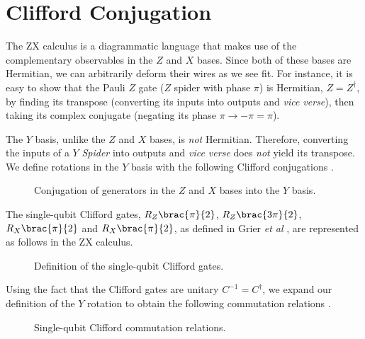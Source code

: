 \section{Clifford Conjugation}%
\label{clifford-conjugation}

The ZX calculus is a diagrammatic language that makes use of the complementary observables in the $Z$ and $X$ bases. Since both of these bases are Hermitian, we can arbitrarily deform their wires as we see fit. For instance, it is easy to show that the Pauli $Z$ gate ($Z$ spider with phase $\pi$) is Hermitian, $Z = Z^\dagger$, by finding its transpose (converting its inputs into outputs and \textit{vice verse}), then taking its complex conjugate (negating its phase $\pi \rightarrow -\pi = \pi$).


The $Y$ basis, unlike the $Z$ and $X$ bases, is \textit{not} Hermitian. Therefore, converting the inputs of a $Y$ \textit{Spider} into outputs and \textit{vice verse} does \textit{not} yield its transpose. We define rotations in the $Y$ basis with the following Clifford conjugations \cite{Yeung2020}.

\begin{figure}[H]
    \centering
    \caption{Conjugation of generators in the $Z$ and $X$ bases into the $Y$ basis.}
    \label{pauli-Y}
\end{figure}

The single-qubit Clifford gates, $R_Z \brac{\pi}{2}$, $R_Z \brac{3\pi}{2}$, $R_X \brac{\pi}{2}$ and $R_X \brac{\pi}{2}$, as defined in Grier \textit{et al} \cite{Grier2016}, are represented as follows in the ZX calculus.

\begin{figure}[H]
    \centering
    \caption{Definition of the single-qubit Clifford gates.}
    \label{clifford-definitions}
\end{figure}


Using the fact that the Clifford gates are unitary $C^{-1} = C^\dagger$, we expand our definition of the $Y$ rotation to obtain the following commutation relations \cite{Yeung2020}.


\begin{figure}[H]
    \centering
    \caption{Single-qubit Clifford commutation relations.}
    \label{clifford-commutation}
\end{figure}

